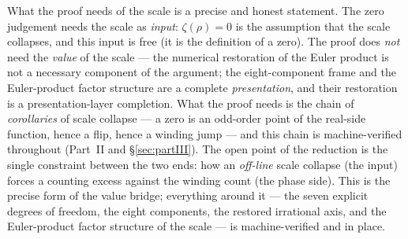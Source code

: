 \documentclass{article}
\newcommand{\zt}{\zeta}
\begin{document}
What the proof needs of the scale is a precise and honest statement.
The zero judgement needs the scale as \emph{input}: $\zt(\rho)=0$ is
the assumption that the scale collapses, and this input is free (it is
the definition of a zero). The proof does \emph{not} need the
\emph{value} of the scale --- the numerical restoration of the Euler
product is not a necessary component of the argument; the
eight-component frame and the Euler-product factor structure are a
complete \emph{presentation}, and their restoration is a
presentation-layer completion. What the proof needs is the chain of
\emph{corollaries} of scale collapse --- a zero is an odd-order point
of the real-side function, hence a flip, hence a winding jump --- and
this chain is machine-verified throughout (Part~II and
\S\ref{sec:partIII}). The open point of the reduction is the single
constraint between the two ends: how an \emph{off-line} scale collapse
(the input) forces a counting excess against the winding count (the
phase side). This is the precise form of the value bridge; everything
around it --- the seven explicit degrees of freedom, the eight
components, the restored irrational axis, and the Euler-product
factor structure of the scale --- is machine-verified and in place.
\end{document}
